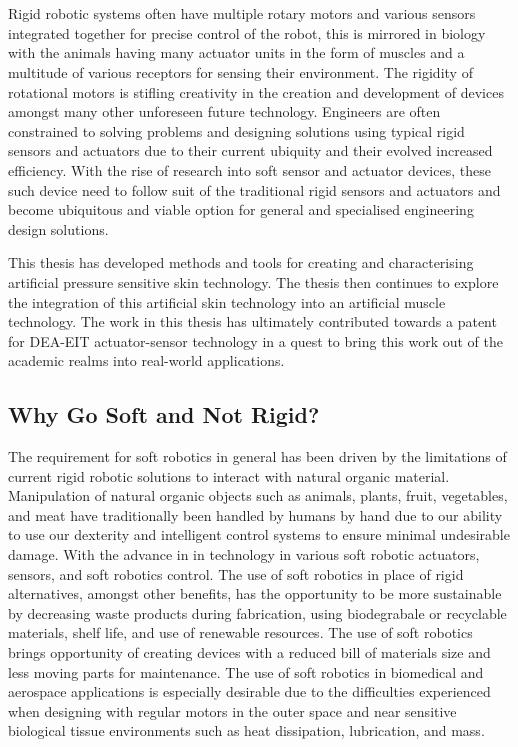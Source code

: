 \chapter{\chapiname}
\label{chapter1}
Rigid robotic systems often have multiple rotary motors and various sensors integrated together for precise control of the robot, this is mirrored in biology with the animals having many actuator units in the form of muscles and a multitude of various receptors for sensing their environment. The rigidity of rotational motors is stifling creativity in the creation and development of devices amongst many other unforeseen future technology. Engineers are often constrained to solving problems and designing solutions using typical rigid sensors and actuators due to their current ubiquity and their evolved increased efficiency. With the rise of research into soft sensor and actuator devices, these such device need to follow suit of the traditional rigid sensors and actuators and become ubiquitous and viable option for general and specialised engineering design solutions. 

This thesis has developed methods and tools for creating and characterising artificial pressure sensitive skin technology. The thesis then continues to explore the integration of this artificial skin technology into an artificial muscle technology. The work in this thesis has ultimately contributed towards a patent for DEA-EIT actuator-sensor technology in a quest to bring this work out of the academic realms into real-world applications.



\section{Why Go Soft and Not Rigid?}
The requirement for soft robotics in general has been driven by the limitations of current rigid robotic solutions to interact with natural organic material. Manipulation of natural organic objects such as animals, plants, fruit, vegetables, and meat have traditionally been handled by humans by hand due to our ability to use our dexterity and intelligent control systems to ensure minimal undesirable damage. With the advance in in technology in various soft robotic actuators\cite{Stella2023,Zhang2023,Hartmann2021,Yasa2023, Manti2016}, sensors\cite{Hegde2023}, and soft robotics control\cite{DellaSantina2023, Armanini2023}. The use of soft robotics in place of rigid alternatives, amongst other benefits, has the opportunity to be more sustainable by decreasing waste products during fabrication, using biodegrabale or recyclable materials, shelf life, and use of renewable resources\cite{Hartmann2021}. The use of soft robotics brings opportunity of creating devices with a reduced bill of materials size and less moving parts for maintenance. The use of soft robotics in biomedical and aerospace applications is especially desirable due to the difficulties experienced when designing with regular motors in the outer space and near sensitive biological tissue environments such as heat dissipation, lubrication, and mass\cite{Murugesan1981,Ashuri2020,Branz2017,Bruschi2021}. 

